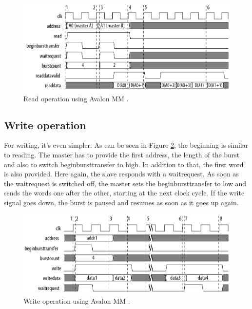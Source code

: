 \begin{figure}[ht!]
  \center
  \includegraphics[width=\linewidth]{"Chapter5-MAU_CTRLU/res/avalon_mm_read.png"}
  \caption{Read operation using Avalon MM \cite{avalon}.}
  \label{fig:avalon/mm_read}
\end{figure}

\subsection{Write operation}

For writing, it's even simpler. As can be seen in Figure \ref{fig:avalon/mm_write}, the beginning 
is similar to reading. The master has to provide the first address, the length of the 
burst and also to switch beginbursttransfer to high. In addition to that, the first word 
is also provided. Here again, the slave responds with a waitrequest. As soon as the waitrequest 
is switched off, the master sets the beginbursttransfer to low and sends the words one after the other, 
starting at the next clock cycle. If the write signal goes down, the burst is paused and resumes 
as soon as it goes up again.

\begin{figure}[ht!]
  \center
  \includegraphics[width=\linewidth]{"Chapter5-MAU_CTRLU/res/avalon_mm_write.png"}
  \caption{Write operation using Avalon MM \cite{avalon}.}
  \label{fig:avalon/mm_write}
\end{figure}

